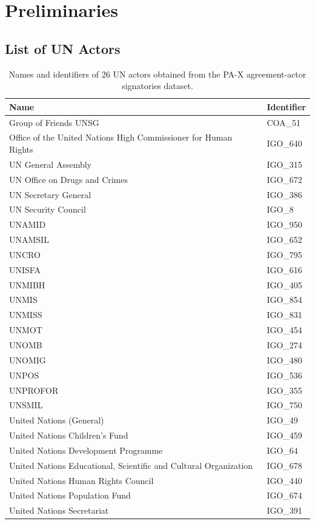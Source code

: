 \documentclass{article}
\begin{document}
\section{Preliminaries}

\subsection{List of UN Actors}

\begin{table}[H]
\begin{center}
\small
\begin{tabularx}{\textwidth}{|X|l|}
    \hline
    \textbf{Name} & \textbf{Identifier} \\
    \hline
    \hline
        Group of Friends UNSG & COA\_51 \\
	\hline
	Office of the United Nations High Commissioner for Human Rights & IGO\_640 \\
	\hline
	UN General Assembly & IGO\_315 \\
	\hline
	UN Office on Drugs and Crimes & IGO\_672 \\
	\hline
	UN Secretary General & IGO\_386 \\
	\hline
	UN Security Council & IGO\_8 \\
	\hline
	UNAMID & IGO\_950 \\
	\hline
	UNAMSIL & IGO\_652 \\
	\hline
	UNCRO & IGO\_795 \\
	\hline
	UNISFA & IGO\_616 \\
	\hline
	UNMIBH & IGO\_405 \\
	\hline
	UNMIS & IGO\_854 \\
	\hline
	UNMISS & IGO\_831 \\
	\hline
	UNMOT & IGO\_454 \\
	\hline
	UNOMB & IGO\_274 \\
	\hline
	UNOMIG & IGO\_480 \\
	\hline
	UNPOS & IGO\_536 \\
	\hline
	UNPROFOR & IGO\_355 \\
	\hline
	UNSMIL & IGO\_750 \\
	\hline
	United Nations (General) & IGO\_49 \\
	\hline
	United Nations Children's Fund & IGO\_459 \\
	\hline
	United Nations Development Programme & IGO\_64 \\
	\hline
	United Nations Educational, Scientific and Cultural Organization & IGO\_678 \\
	\hline
	United Nations Human Rights Council & IGO\_440 \\
	\hline
	United Nations Population Fund & IGO\_674 \\
	\hline
	United Nations Secretariat & IGO\_391 \\
	\hline
\end{tabularx}
\end{center}
\normalsize
\caption{Names and identifiers of 26 UN actors obtained from the PA-X agreement-actor signatories dataset. }
\end{table}
\end{document}
